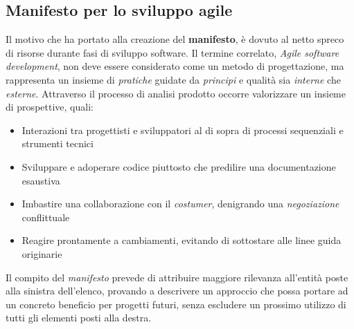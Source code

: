 \documentclass{article}
\begin{document}
\subsection*{Manifesto per lo sviluppo agile}
\large
Il motivo che ha portato alla creazione del \textbf{manifesto}, è dovuto al netto spreco di risorse durante fasi di sviluppo software. Il termine correlato, \textit{Agile software development}, non deve essere considerato come un metodo di progettazione, ma rappresenta un insieme di \textit{pratiche} guidate da \textit{principi} e qualità sia \textit{interne} che \textit{esterne}. Attraverso il processo di analisi prodotto occorre valorizzare un insieme di prospettive, quali:
\begin{itemize}[label={-}]
    \itemsep0em
    \item Interazioni tra progettisti e sviluppatori al di sopra di processi sequenziali e strumenti tecnici
    \item Sviluppare e adoperare codice piuttosto che predilire una documentazione esaustiva
    \item Imbastire una collaborazione con il \textit{costumer}, denigrando una \textit{negoziazione} conflittuale
    \item Reagire prontamente a cambiamenti, evitando di sottostare alle linee guida originarie
\end{itemize}  
Il compito del \textit{manifesto} prevede di attribuire maggiore rilevanza all'entità poste alla sinistra dell'elenco, provando a descrivere un approccio che possa portare ad un concreto beneficio per progetti futuri, senza escludere un prossimo utilizzo di tutti gli elementi posti alla destra.
\end{document}
